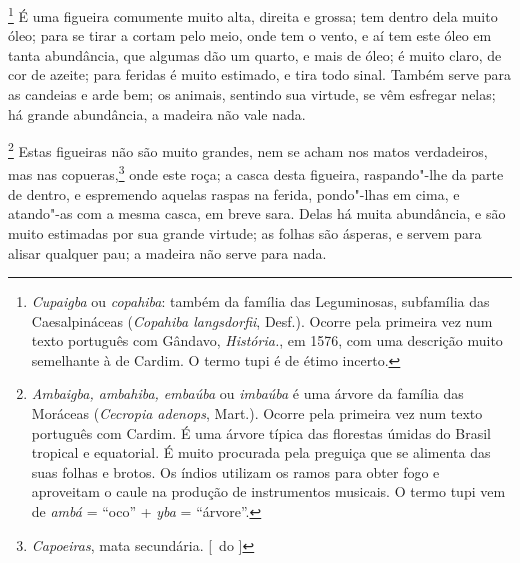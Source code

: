 \footnote{ \textit{Cupaigba} ou \textit{copahiba}: 
também da família das Leguminosas, subfamília das Caesalpináceas
(\textit{Copahiba langsdorfii}, Desf.). Ocorre pela primeira vez num
texto português com Gândavo, \textit{História.}, em 1576, com uma
descrição muito semelhante à de Cardim. O termo tupi é de étimo
incerto.} É uma figueira comumente muito alta, direita e
grossa; tem dentro dela muito óleo; para se tirar a cortam pelo meio,
onde tem o vento, e aí tem este óleo em tanta abundância, que algumas
dão um quarto, e mais de óleo; é muito claro, de cor de azeite; para
feridas é muito estimado, e tira todo sinal. Também serve para as
candeias e arde bem; os animais, sentindo sua virtude, se vêm esfregar
nelas; há grande abundância, a madeira não vale nada.

\footnote{ \textit{Ambaigba, ambahiba, embaúba} ou
 \textit{imbaúba} é uma árvore da família das Moráceas
(\textit{Cecropia adenops}, Mart.). Ocorre pela primeira vez num texto
português com Cardim. É uma árvore típica das florestas úmidas do
Brasil tropical e equatorial. É muito procurada pela preguiça que se
alimenta das suas folhas e brotos. Os índios utilizam os ramos para
obter fogo e aproveitam o caule na produção de instrumentos musicais. O
termo tupi vem de \textit{ambá} = ``oco'' + \textit{yba} = ``árvore''.} 
Estas figueiras não são muito grandes, nem se
acham nos matos verdadeiros, mas nas copueras,\footnote{ \textit{Capoeiras}, mata secundária. [~do ]} onde este roça; a casca 
desta figueira, raspando"-lhe da parte de dentro, e espremendo aquelas
raspas na ferida, pondo"-lhas em cima, e atando"-as com a mesma casca,
em breve sara. Delas há muita abundância, e são muito estimadas por sua
grande virtude; as folhas são ásperas, e servem para alisar qualquer
pau; a madeira não serve para nada.

